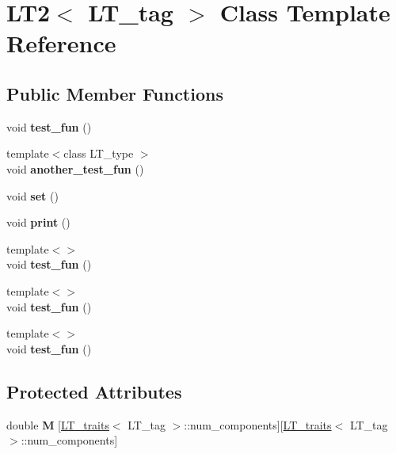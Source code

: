 \hypertarget{classLT2}{}\section{L\+T2$<$ L\+T\+\_\+tag $>$ Class Template Reference}
\label{classLT2}
\subsection*{Public Member Functions}
\begin{DoxyCompactItemize}
\item 
\hypertarget{classLT2_ac89d581511adbe0abf1aa0f4e92afb77}{}void {\bfseries test\+\_\+fun} ()\label{classLT2_ac89d581511adbe0abf1aa0f4e92afb77}

\item 
\hypertarget{classLT2_ad113a74957832ab015a158baa0d7d90e}{}{\footnotesize template$<$class L\+T\+\_\+type $>$ }\\void {\bfseries another\+\_\+test\+\_\+fun} ()\label{classLT2_ad113a74957832ab015a158baa0d7d90e}

\item 
\hypertarget{classLT2_abf8638047dcf3b2f990dbe7678f94d0b}{}void {\bfseries set} ()\label{classLT2_abf8638047dcf3b2f990dbe7678f94d0b}

\item 
\hypertarget{classLT2_a6aa951f53672c80d4ce1662d661860b5}{}void {\bfseries print} ()\label{classLT2_a6aa951f53672c80d4ce1662d661860b5}

\item 
\hypertarget{classLT2_a0e46ccb0d7527bfebce84acd4618e3d5}{}{\footnotesize template$<$$>$ }\\void {\bfseries test\+\_\+fun} ()\label{classLT2_a0e46ccb0d7527bfebce84acd4618e3d5}

\item 
\hypertarget{classLT2_a96edf9739c048ad07a7d3d67d3b74315}{}{\footnotesize template$<$$>$ }\\void {\bfseries test\+\_\+fun} ()\label{classLT2_a96edf9739c048ad07a7d3d67d3b74315}

\item 
\hypertarget{classLT2_af79d8965242c388aaa989b2422bf9959}{}{\footnotesize template$<$$>$ }\\void {\bfseries test\+\_\+fun} ()\label{classLT2_af79d8965242c388aaa989b2422bf9959}

\end{DoxyCompactItemize}
\subsection*{Protected Attributes}
\begin{DoxyCompactItemize}
\item 
\hypertarget{classLT2_a200bf6db96eab02e09aff2e3b8f9940b}{}double {\bfseries M} \mbox{[}\hyperlink{classLT__traits}{L\+T\+\_\+traits}$<$ L\+T\+\_\+tag $>$\+::num\+\_\+components\mbox{]}\mbox{[}\hyperlink{classLT__traits}{L\+T\+\_\+traits}$<$ L\+T\+\_\+tag $>$\+::num\+\_\+components\mbox{]}\label{classLT2_a200bf6db96eab02e09aff2e3b8f9940b}

\end{DoxyCompactItemize}



